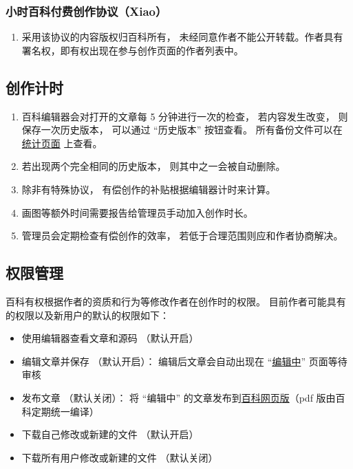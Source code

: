 \subsubsection{小时百科付费创作协议（Xiao）}
\begin{enumerate}
\item 采用该协议的内容版权归百科所有， 未经同意作者不能公开转载。作者具有署名权，即有权出现在参与创作页面的作者列表中。
\end{enumerate}

\subsection{创作计时}
\begin{enumerate}
\item 百科编辑器会对打开的文章每 5 分钟进行一次的检查， 若内容发生改变， 则保存一次历史版本， 可以通过 “历史版本” 按钮查看。 所有备份文件可以在 \href{https://github.com/MacroUniverse/PhysWiki-backup}{统计页面} 上查看。
\item 若出现两个完全相同的历史版本， 则其中之一会被自动删除。
\item 除非有特殊协议， 有偿创作的补贴根据编辑器计时来计算。
\item 画图等额外时间需要报告给管理员手动加入创作时长。
\item 管理员会定期检查有偿创作的效率， 若低于合理范围则应和作者协商解决。
\end{enumerate}

\subsection{权限管理}
百科有权根据作者的资质和行为等修改作者在创作时的权限。 目前作者可能具有的权限以及新用户的默认的权限如下：
\begin{itemize}
\item 使用编辑器查看文章和源码 （默认开启）
\item 编辑文章并保存 （默认开启）： 编辑后文章会自动出现在 “\href{https://wuli.wiki/changed}{编辑中}” 页面等待审核
\item 发布文章 （默认关闭）： 将 “编辑中” 的文章发布到\href{https://wuli.wiki/online}{百科网页版}（pdf 版由百科定期统一编译）
\item 下载自己修改或新建的文件 （默认开启）
\item 下载所有用户修改或新建的文件 （默认关闭）
\end{itemize}
